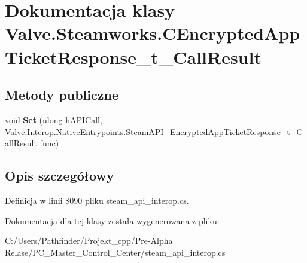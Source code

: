 \hypertarget{class_valve_1_1_steamworks_1_1_c_encrypted_app_ticket_response__t___call_result}{}\section{Dokumentacja klasy Valve.\+Steamworks.\+C\+Encrypted\+App\+Ticket\+Response\+\_\+t\+\_\+\+Call\+Result}
\label{class_valve_1_1_steamworks_1_1_c_encrypted_app_ticket_response__t___call_result}
\subsection*{Metody publiczne}
\begin{DoxyCompactItemize}
\item 
\mbox{\label{class_valve_1_1_steamworks_1_1_c_encrypted_app_ticket_response__t___call_result_a602c86d1750f7b83e0fb2e16f4eb8ba4}} 
void {\bfseries Set} (ulong h\+A\+P\+I\+Call, Valve.\+Interop.\+Native\+Entrypoints.\+Steam\+A\+P\+I\+\_\+\+Encrypted\+App\+Ticket\+Response\+\_\+t\+\_\+\+Call\+Result func)
\end{DoxyCompactItemize}


\subsection{Opis szczegółowy}


Definicja w linii 8090 pliku steam\+\_\+api\+\_\+interop.\+cs.



Dokumentacja dla tej klasy została wygenerowana z pliku\+:\begin{DoxyCompactItemize}
\item 
C\+:/\+Users/\+Pathfinder/\+Projekt\+\_\+cpp/\+Pre-\/\+Alpha Relase/\+P\+C\+\_\+\+Master\+\_\+\+Control\+\_\+\+Center/steam\+\_\+api\+\_\+interop.\+cs\end{DoxyCompactItemize}
